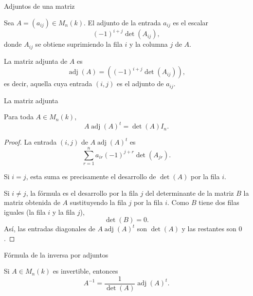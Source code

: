 \begin{frame}{Adjuntos de una matriz}

\begin{definition}
Sea \(A=(a_{ij})\in M_n(k)\). El \alert{adjunto} de la entrada
\(a_{ij}\) es el escalar
\[
(-1)^{i+j}\det(A_{ij}),
\]
donde \(A_{ij}\) se obtiene suprimiendo la fila \(i\) y la columna
\(j\) de \(A\).

La \alert{matriz adjunta} de \(A\) es
\[
\operatorname{adj}(A)=((-1)^{i+j}\det(A_{ij})),
\]
es decir, aquella cuya entrada \((i,j)\) es el adjunto de \(a_{ij}\).
\end{definition}

\end{frame}



\begin{frame}{La matriz adjunta}

\begin{proposition}
Para toda \(A\in M_n(k)\),
\[
A\operatorname{adj}(A)^t=\det(A)I_n.
\]
\end{proposition}

\vspace{-15pt}

\begin{proof}
La entrada \((i,j)\) de \(A\operatorname{adj}(A)^t\) es
\[
\sum_{r=1}^n a_{ir}(-1)^{j+r}\det(A_{jr}).
\]

Si \(i=j\), esta suma es precisamente el desarrollo de
\(\det(A)\) por la fila \(i\). 

Si \(i\neq j\), la fórmula es el desarrollo por la fila \(j\) del determinante de la matriz \(B\) la matriz obtenida de
\(A\) sustituyendo la fila \(j\) por la fila \(i\). Como \(B\) tiene dos filas iguales (la fila \(i\) y la fila \(j\)),
\[
\det(B)=0.
\]
Así, las entradas diagonales de \(A\operatorname{adj}(A)^t\) son
\(\det(A)\) y las restantes son \(0\). 
\end{proof}

\end{frame}

\begin{frame}{Fórmula de la inversa por adjuntos}

\begin{corollary}
Si \(A\in M_n(k)\) es invertible, entonces
\[
A^{-1}
=
\frac{1}{\det(A)}\operatorname{adj}(A)^t.
\]
\end{corollary}

\end{frame}

